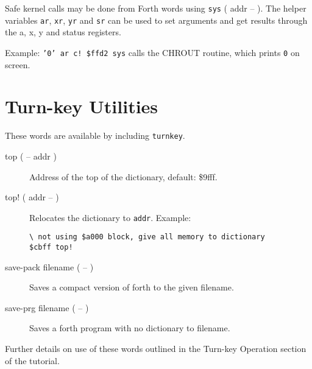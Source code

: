 Safe kernel calls may be done from Forth words using \texttt{sys} ( addr -- ). The helper variables \texttt{ar}, \texttt{xr}, \texttt{yr} and \texttt{sr} can be used to set arguments and get results through the a, x, y and status registers.

Example: \texttt{'0' ar c! \$ffd2 sys} calls the CHROUT routine, which prints \texttt{0} on screen.

\section{Turn-key Utilities}
These words are available by including \texttt{turnkey}.
\begin{description}
\item[top ( -- addr )] Address of the top of the dictionary, default: \$9fff.

\item[top! ( addr -- )] Relocates the dictionary to \texttt{addr}. Example:

\begin{verbatim}
\ not using $a000 block, give all memory to dictionary
$cbff top!
\end{verbatim}

\item[save-pack filename ( -- )] Saves a compact version of forth to the given filename.
\item[save-prg filename ( -- )] Saves a forth program with no dictionary to filename.
\end{description}

	Further details on use of these words outlined in the Turn-key Operation section of the tutorial.
